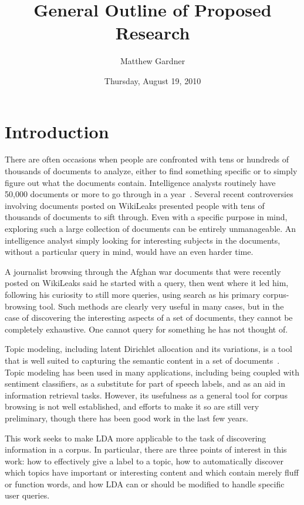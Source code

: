 \documentclass[onecolumn, 12pt]{article}
\title{General Outline of Proposed Research}
\author{Matthew Gardner}
\date{Thursday, August 19, 2010}
\begin{document}
\maketitle

\section{Introduction}

There are often occasions when people are confronted with tens or hundreds of
thousands of documents to analyze, either to find something specific or to
simply figure out what the documents contain.  Intelligence analysts routinely
have 50,000 documents or more to go through in a
year~\cite{washingtonpostarticle}.  Several recent controversies involving
documents posted on WikiLeaks presented people with tens of thousands of
documents to sift through.  Even with a specific purpose in mind, exploring
such a large collection of documents can be entirely unmanageable.  An
intelligence analyst simply looking for interesting subjects in the documents,
without a particular query in mind, would have an even harder time.

A journalist browsing through the Afghan war documents that were recently
posted on WikiLeaks said he started with a query, then went where it led him,
following his curiosity to still more queries, using search as his primary
corpus-browsing tool.  Such methods are clearly very useful in many cases, but
in the case of discovering the interesting aspects of a set of documents, they
cannot be completely exhaustive.  One cannot query for something he has not
thought of.

Topic modeling, including latent Dirichlet allocation and its variations, is a
tool that is well suited to capturing the semantic content in a set of
documents~\cite{blei-2003-latent-dirichlet-allocation}.  Topic modeling has
been used in many applications, including being coupled with sentiment
classifiers, as a substitute for part of speech labels, and as an aid in
information retrieval tasks.  However, its usefulness as a general tool for
corpus browsing is not well established, and efforts to make it so are still
very preliminary, though there has been good work in the last few years.

This work seeks to make LDA more applicable to the task of discovering
information in a corpus.  In particular, there are three points of interest in
this work: how to effectively give a label to a topic, how to automatically
discover which topics have important or interesting content and which contain
merely fluff or function words, and how LDA can or should be modified to handle
specific user queries.
\end{document}
